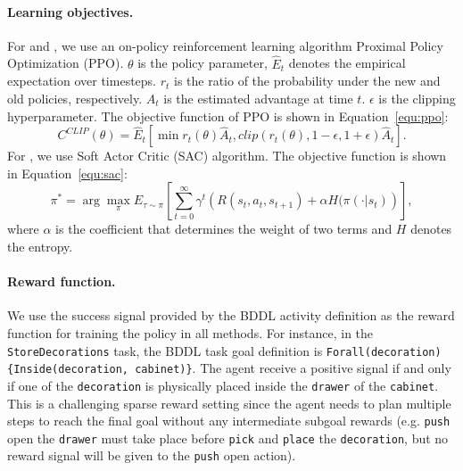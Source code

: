 \paragraph{Learning objectives.} %
For \rlprim and \rlprimhist, we use an on-policy reinforcement learning algorithm Proximal Policy Optimization (PPO). $\theta$ is the policy parameter, $\hat{E}_t$ denotes the empirical expectation over timesteps. $r_{t}$ is the ratio of the probability under the new and old policies, respectively. $\hat{A}_t$ is the estimated advantage at time $t$. $\epsilon$ is the clipping hyperparameter. The objective function of PPO is shown in Equation~\ref{equ:ppo}:
\begin{equation}
    C^{CLIP}(\theta) = \hat{E}_t[\min r_t(\theta)\hat{A}_t, clip(r_t(\theta), 1-\epsilon, 1+\epsilon)\hat{A}_t].
    \label{equ:ppo}
\end{equation}
For \rlvmc, we use Soft Actor Critic (SAC) algorithm. The objective function is shown in Equation~\ref{equ:sac}:
\begin{equation}
    \pi^* = \arg\max_\pi E_{\tau\sim\pi}\left[\sum_{t=0}^\infty \gamma^t \left(R(s_t, a_t, s_{t+1})+\alpha H (\pi(\cdot|s_t)\right)\right],
    \label{equ:sac}
\end{equation}
where $\alpha$ is the coefficient that determines the weight of two terms and $H$ denotes the entropy.

\paragraph{Reward function.} %
We use the success signal provided by the BDDL activity definition as the reward function for training the policy in all methods. For instance, in the \texttt{StoreDecorations} task, the BDDL task goal definition is \texttt{Forall(decoration)\{Inside(decoration, cabinet)\}}. The agent receive a positive signal if and only if one of the \texttt{decoration} is physically placed inside the \texttt{drawer} of the \texttt{cabinet}. This is a challenging sparse reward setting since the agent needs to plan multiple steps to reach the final goal without any intermediate subgoal rewards (e.g. \texttt{push} open the \texttt{drawer} must take place before \texttt{pick} and \texttt{place} the \texttt{decoration}, but no reward signal will be given to the \texttt{push} open action).%

